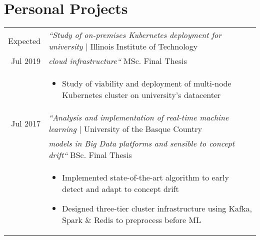 \documentclass[a4paper,10pt]{article}
\begin{document}
\section{Personal Projects}
\begin{tabular}{rp{14.85cm}}

  Expected & \emph{``Study of on-premises Kubernetes deployment for university } \hfill \footnotesize{| Illinois Institute of Technology} \\
  Jul 2019 & \hspace{0.1mm} \emph{cloud infrastructure``} \hfill \footnotesize{MSc. Final Thesis} \\
  & \footnotesize{ \begin{itemize}[noitemsep,topsep=3pt]
  \vspace{-0.1in}
  \item Study of viability and deployment of multi-node Kubernetes cluster on university's datacenter
  \end{itemize}} \vspace{-0.1in} \\ 

  Jul 2017 & \emph{``Analysis and implementation of real-time machine learning } \hfill \footnotesize{| University of the Basque Country} \\
  & \hspace{0.1mm} \emph{models in Big Data platforms and sensible to concept drift``} \hfill \footnotesize{BSc. Final Thesis} \\
  & \footnotesize{ \begin{itemize}[noitemsep,topsep=3pt]
  \vspace{-0.1in}
  \item Implemented state-of-the-art algorithm to early detect and adapt to concept drift
  \item Designed three-tier cluster infrastructure using Kafka, Spark \& Redis to preprocess before ML
  \end{itemize}} \vspace{-0.1in} \\ 


\end{tabular}
\end{document}
